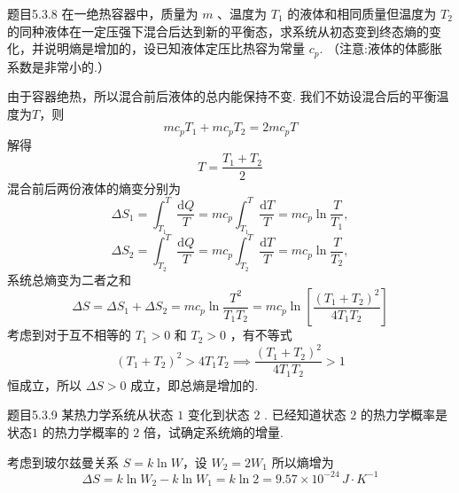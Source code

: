 \begin{question}{题目5.3.8}
    在一绝热容器中，质量为 $m$ 、温度为 $T_1$ 的液体和相同质量但温度为 $T_2$ 的同种液体在一定压强下混合后达到新的平衡态，求系统从初态变到终态熵的变化，并说明熵是增加的，设已知液体定压比热容为常量 $c_p$. （注意:液体的体膨胀系数是非常小的.）
\end{question}
\begin{solution}
    由于容器绝热，所以混合前后液体的总内能保持不变. 我们不妨设混合后的平衡温度为$T$，则
    $$
        mc_pT_1 + mc_pT_2 = 2mc_pT
    $$
    解得
    $$
        T = \frac{T_1 + T_2}{2}
    $$
    混合前后两份液体的熵变分别为
    $$
        \Delta{S_1} = \int_{T_1}^{T} \frac{\mathrm{d}Q}{T}
        = mc_p\int_{T_1}^{T} \frac{\mathrm{d}T}{T}
        = mc_p\ln\frac{T}{T_1},
    $$
    $$
        \Delta{S_2} = \int_{T_2}^{T} \frac{\mathrm{d}Q}{T}
        = mc_p\int_{T_2}^{T} \frac{\mathrm{d}T}{T}
        = mc_p\ln\frac{T}{T_2},
    $$
    系统总熵变为二者之和
    $$
        \Delta{S} = \Delta{S_1} + \Delta{S_2}
        = mc_p\ln\frac{T^2}{T_1T_2}
        = mc_p\ln\left[\frac{(T_1 + T_2)^2}{4T_1T_2}\right]
    $$
    考虑到对于互不相等的 $T_1>0$ 和 $T_2>0$ ，有不等式
    $$
        (T_1+T_2)^2 > 4T_1T_2
        \implies
        \frac{(T_1+T_2)^2}{4T_1T_2} > 1
    $$
    恒成立，所以 $\Delta{S} > 0$ 成立，即总熵是增加的.
\end{solution}

\begin{question}{题目5.3.9}
    某热力学系统从状态 $1$ 变化到状态 $2$ . 已经知道状态 $2$ 的热力学概率是状态$1$ 的热力学概率的 $2$ 倍，试确定系统熵的增量.
\end{question}
\begin{solution}
    考虑到玻尔兹曼关系 $S = k \ln{W}$，设 $W_2 = 2W_1$ 所以熵增为
    $$
        \Delta{S} = k\ln{W_2} - k\ln{W_1} = k\ln{2} =9.57 \times 10 ^{-24} \,\si{J \cdot K^{-1}}
    $$
\end{solution}